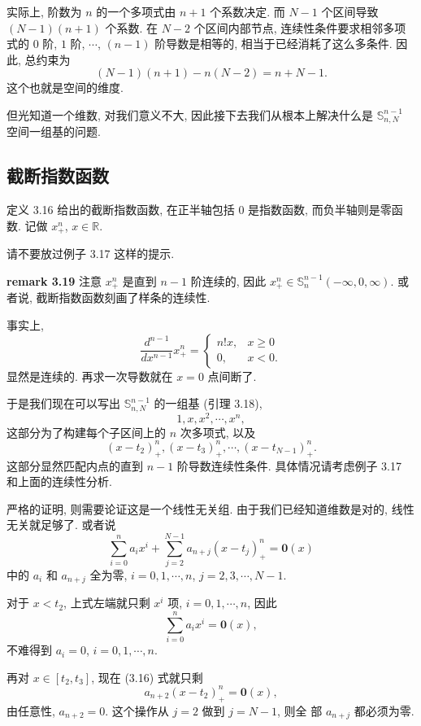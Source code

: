 \documentclass[a4paper]{ctexart}
\begin{document}
实际上, 阶数为 $n$ 的一个多项式由 $n + 1$ 个系数决定. 
而 $N - 1$ 个区间导致 $(N - 1)(n + 1)$ 个系数. 
在 $N - 2$ 个区间内部节点, 连续性条件要求相邻多项式的 $0$ 阶, $1$ 阶,
$\cdots$, $(n - 1)$ 阶导数是相等的, 相当于已经消耗了这么多条件. 因此, 
总约束为 
$$
(N - 1)(n + 1) - n(N - 2) = n + N - 1.
$$
这个也就是空间的维度.

但光知道一个维数, 对我们意义不大, 因此接下去我们从根本上解决什么是
$\mathbb{S}_{n, N}^{n - 1}$ 空间一组基的问题. 

\subsection{截断指数函数}

定义 3.16 给出的截断指数函数, 在正半轴包括 $0$ 是指数函数, 而负半轴则是零函数. 
记做 $x_+^n$, $x \in \mathbb{R}$.

请不要放过例子 3.17 这样的提示.

{\bf remark 3.19} 注意 $x_+^n$ 是直到 $n - 1$ 阶连续的, 因此 $x_+^n
\in \mathbb{S}_{n}^{n - 1}(-\infty, 0, \infty)$. 或者说, 
截断指数函数刻画了样条的连续性. 

事实上, 
$$
\frac{d^{n - 1}}{dx^{n - 1}} x_+^n = \left\{
\begin{array}{ll}
  n! x ,& x \geq 0\\
  0,& x < 0.
\end{array}
\right.
$$
显然是连续的. 再求一次导数就在 $x = 0$ 点间断了. 


于是我们现在可以写出 $\mathbb{S}_{n, N}^{n - 1}$ 的一组基 (引理 3.18),
$$
1, x, x^2, \cdots, x^n,
$$
这部分为了构建每个子区间上的 $n$ 次多项式, 以及
$$
(x - t_2)_+^n, (x - t_3)_+^n, \cdots, (x - t_{N - 1})_+^n.
$$
这部分显然匹配内点的直到 $n - 1$ 阶导数连续性条件. 具体情况请考虑例子 
3.17 和上面的连续性分析.

严格的证明, 则需要论证这是一个线性无关组. 由于我们已经知道维数是对的,
线性无关就足够了. 或者说
$$
\sum_{i = 0}^n a_i x^i + \sum_{j = 2}^{N - 1} a_{n + j}(x - t_j)_+^n = 
\mathbf{0}(x)
$$
中的 $a_i$ 和 $a_{n + j}$ 全为零, $i = 0, 1, \cdots, n$, $j = 2, 3,
\cdots, N - 1$.

对于 $x < t_2$, 上式左端就只剩 $x^i$ 项, $i = 0, 1, \cdots, n$, 因此
$$
\sum_{i = 0}^n a_i x^i = \mathbf{0}(x), 
$$
不难得到 $a_i = 0$, $i = 0, 1, \cdots, n$.

再对 $x \in [t_2, t_3]$, 现在 (3.16) 式就只剩
$$
a_{n + 2}(x - t_2)_+^n = \mathbf{0}(x),
$$
由任意性, $a_{n + 2} = 0$. 这个操作从 $j = 2$ 做到 $j = N - 1$, 则全
部 $a_{n + j}$ 都必须为零.
\end{document}
